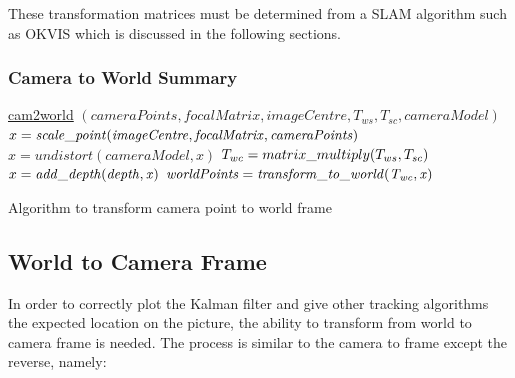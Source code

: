\documentclass[11pt,twoside]{report}
\begin{document}
These transformation matrices must be determined from a SLAM algorithm such as OKVIS which is discussed in the following sections.
\subsubsection{Camera to World Summary}

\begin{algorithm}
	\DontPrintSemicolon
	\SetAlgoLined
	\underline{cam2world} $(cameraPoints,focalMatrix,imageCentre,T_{ws},T_{sc},cameraModel)$\;
	\texttt{\\}
	$x = \mathit{scale\text{\textunderscore}point(imageCentre,focalMatrix,cameraPoints)}$ 
	$x = \mathit{undistort(cameraModel,x)}$ 
	$T_{wc} = matrix\text{\textunderscore}multiply(T_{ws},T_{sc})$
	\texttt{\\}
	$x = \mathit{add\text{\textunderscore}depth(depth,x)}$ 
	$\mathit{worldPoints} = \mathit{transform\text{\textunderscore}to\text{\textunderscore}world(T_{wc},x)}$ 
	
	\caption{Algorithm to transform camera point to world frame}
	\label{alg:weights}
\end{algorithm}



\subsection{World to Camera Frame} \label{w_c_frame}

In order to correctly plot the Kalman filter and give other tracking algorithms the expected location on the picture, the ability to transform from world to camera frame is needed. The process is similar to the camera to frame except the reverse, namely:
\end{document}
